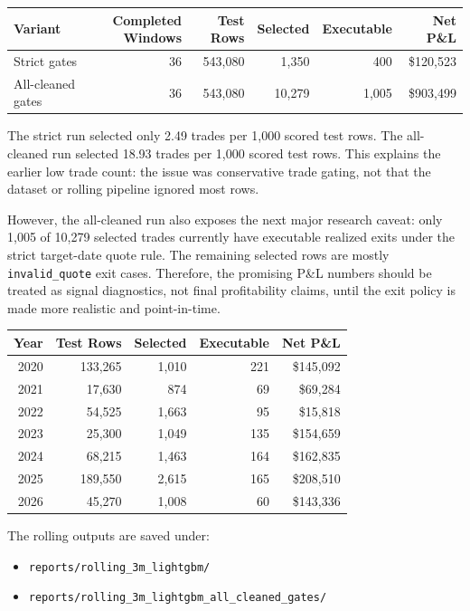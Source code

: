 \documentclass[11pt]{article}
\begin{document}
\begin{center}
\begin{tabular}{lrrrrr}
\toprule
Variant & Completed Windows & Test Rows & Selected & Executable & Net P\&L \\
\midrule
Strict gates & 36 & 543,080 & 1,350 & 400 & \$120,523 \\
All-cleaned gates & 36 & 543,080 & 10,279 & 1,005 & \$903,499 \\
\bottomrule
\end{tabular}
\end{center}

The strict run selected only 2.49 trades per 1,000 scored test rows. The
all-cleaned run selected 18.93 trades per 1,000 scored test rows. This explains
the earlier low trade count: the issue was conservative trade gating, not that
the dataset or rolling pipeline ignored most rows.

However, the all-cleaned run also exposes the next major research caveat:
only 1,005 of 10,279 selected trades currently have executable realized exits
under the strict target-date quote rule. The remaining selected rows are mostly
\texttt{invalid\_quote} exit cases. Therefore, the promising P\&L numbers should
be treated as signal diagnostics, not final profitability claims, until the
exit policy is made more realistic and point-in-time.

\begin{center}
\begin{tabular}{rrrrr}
\toprule
Year & Test Rows & Selected & Executable & Net P\&L \\
\midrule
2020 & 133,265 & 1,010 & 221 & \$145,092 \\
2021 & 17,630 & 874 & 69 & \$69,284 \\
2022 & 54,525 & 1,663 & 95 & \$15,818 \\
2023 & 25,300 & 1,049 & 135 & \$154,659 \\
2024 & 68,215 & 1,463 & 164 & \$162,835 \\
2025 & 189,550 & 2,615 & 165 & \$208,510 \\
2026 & 45,270 & 1,008 & 60 & \$143,336 \\
\bottomrule
\end{tabular}
\end{center}

The rolling outputs are saved under:

\begin{itemize}
  \item \texttt{reports/rolling\_3m\_lightgbm/}
  \item \texttt{reports/rolling\_3m\_lightgbm\_all\_cleaned\_gates/}
\end{itemize}
\end{document}
